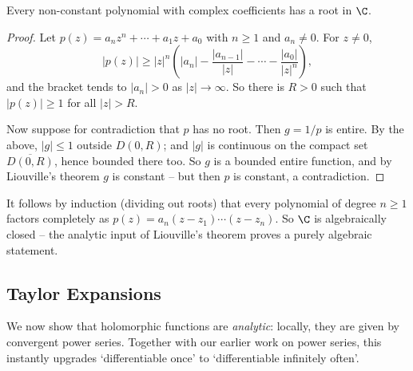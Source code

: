 \begin{theorem}
    Every non-constant polynomial with complex coefficients has a root in $\C$.
\end{theorem}
\begin{proof}
    Let $p(z) = a_n z^n + \cdots + a_1 z + a_0$ with $n \geq 1$ and $a_n \neq 0$. For $z \neq 0$,
    $$
    |p(z)| \geq |z|^n \left(|a_n| - \frac{|a_{n - 1}|}{|z|} - \cdots - \frac{|a_0|}{|z|^n}\right),
    $$
    and the bracket tends to $|a_n| > 0$ as $|z| \rightarrow \infty$. So there is $R > 0$ such that $|p(z)| \geq 1$ for all $|z| > R$.

    Now suppose for contradiction that $p$ has no root. Then $g = 1/p$ is entire. By the above, $|g| \leq 1$ outside $D(0, R)$; and $|g|$ is continuous on the compact set $\overline{D(0, R)}$, hence bounded there too. So $g$ is a bounded entire function, and by Liouville's theorem $g$ is constant -- but then $p$ is constant, a contradiction.
\end{proof}

\begin{remark}
    It follows by induction (dividing out roots) that every polynomial of degree $n \geq 1$ factors completely as $p(z) = a_n(z - z_1)\cdots(z - z_n)$. So $\C$ is algebraically closed -- the analytic input of Liouville's theorem proves a purely algebraic statement.
\end{remark}

\subsection{Taylor Expansions}

We now show that holomorphic functions are \emph{analytic}: locally, they are given by convergent power series. Together with our earlier work on power series, this instantly upgrades `differentiable once' to `differentiable infinitely often'.

